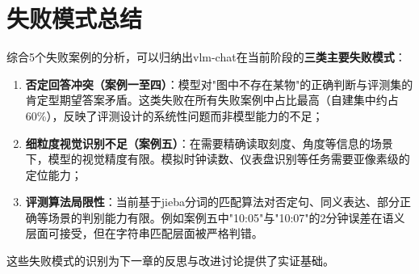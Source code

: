 \section{失败模式总结}

综合5个失败案例的分析，可以归纳出vlm-chat在当前阶段的\textbf{三类主要失败模式}：

\begin{enumerate}
  \item \textbf{否定回答冲突（案例一至四）}：模型对"图中不存在某物"的正确判断与评测集的肯定型期望答案矛盾。这类失败在所有失败案例中占比最高（自建集中约占60\%），反映了评测设计的系统性问题而非模型能力的不足；

  \item \textbf{细粒度视觉识别不足（案例五）}：在需要精确读取刻度、角度等信息的场景下，模型的视觉精度有限。模拟时钟读数、仪表盘识别等任务需要亚像素级的定位能力；

  \item \textbf{评测算法局限性}：当前基于jieba分词的匹配算法对否定句、同义表达、部分正确等场景的判别能力有限。例如案例五中"10:05"与"10:07"的2分钟误差在语义层面可接受，但在字符串匹配层面被严格判错。
\end{enumerate}

这些失败模式的识别为下一章的反思与改进讨论提供了实证基础。
